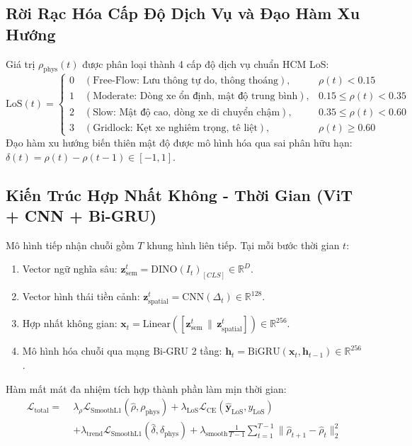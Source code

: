 \documentclass[11pt,a4paper]{article}
\begin{document}
\subsection{Rời Rạc Hóa Cấp Độ Dịch Vụ và Đạo Hàm Xu Hướng}
Giá trị $\rho_{\text{phys}}(t)$ được phân loại thành 4 cấp độ dịch vụ chuẩn HCM LoS:
\begin{equation}
    \text{LoS}(t) = \begin{cases} 
    0 \quad (\text{Free-Flow: Lưu thông tự do, thông thoáng}), & \rho(t) < 0.15 \\ 
    1 \quad (\text{Moderate: Dòng xe ổn định, mật độ trung bình}), & 0.15 \le \rho(t) < 0.35 \\ 
    2 \quad (\text{Slow: Mật độ cao, dòng xe di chuyển chậm}), & 0.35 \le \rho(t) < 0.60 \\ 
    3 \quad (\text{Gridlock: Kẹt xe nghiêm trọng, tê liệt}), & \rho(t) \ge 0.60 
    \end{cases}
\end{equation}
Đạo hàm xu hướng biến thiên mật độ được mô hình hóa qua sai phân hữu hạn: $\delta(t) = \rho(t) - \rho(t-1) \in [-1, 1]$.

\subsection{Kiến Trúc Hợp Nhất Không - Thời Gian (ViT + CNN + Bi-GRU)}
Mô hình tiếp nhận chuỗi gồm $T$ khung hình liên tiếp. Tại mỗi bước thời gian $t$:
\begin{enumerate}
    \item Vector ngữ nghĩa sâu: $\mathbf{z}_{\text{sem}}^t = \text{DINO}(I_t)_{[CLS]} \in \mathbb{R}^D$.
    \item Vector hình thái tiền cảnh: $\mathbf{z}_{\text{spatial}}^t = \text{CNN}(\Delta_t) \in \mathbb{R}^{128}$.
    \item Hợp nhất không gian: $\mathbf{x}_t = \text{Linear}([\mathbf{z}_{\text{sem}}^t \,\|\, \mathbf{z}_{\text{spatial}}^t]) \in \mathbb{R}^{256}$.
    \item Mô hình hóa chuỗi qua mạng Bi-GRU 2 tầng: $\mathbf{h}_t = \text{BiGRU}(\mathbf{x}_t, \mathbf{h}_{t-1}) \in \mathbb{R}^{256}$.
\end{enumerate}

Hàm mất mát đa nhiệm tích hợp thành phần làm mịn thời gian:
\begin{equation}
\begin{split}
    \mathcal{L}_{\text{total}} = \; & \lambda_{\rho} \mathcal{L}_{\text{SmoothL1}}(\hat{\rho}, \rho_{\text{phys}}) + \lambda_{\text{LoS}} \mathcal{L}_{\text{CE}}(\hat{\mathbf{y}}_{\text{LoS}}, y_{\text{LoS}}) \\
    & + \lambda_{\text{trend}} \mathcal{L}_{\text{SmoothL1}}(\hat{\delta}, \delta_{\text{phys}}) + \lambda_{\text{smooth}} \frac{1}{T-1} \sum_{t=1}^{T-1} \|\hat{\rho}_{t+1} - \hat{\rho}_t\|_2^2
\end{split}
\end{equation}
\end{document}
